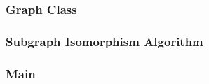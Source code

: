 \documentclass{article}
\begin{document}
    \subsubsection{Graph Class}
      
    \subsubsection{Subgraph Isomorphism Algorithm}
      
    \subsubsection{Main}
      

  \printbibliography[heading=bibintoc,
                     title={References}]
\end{document}
